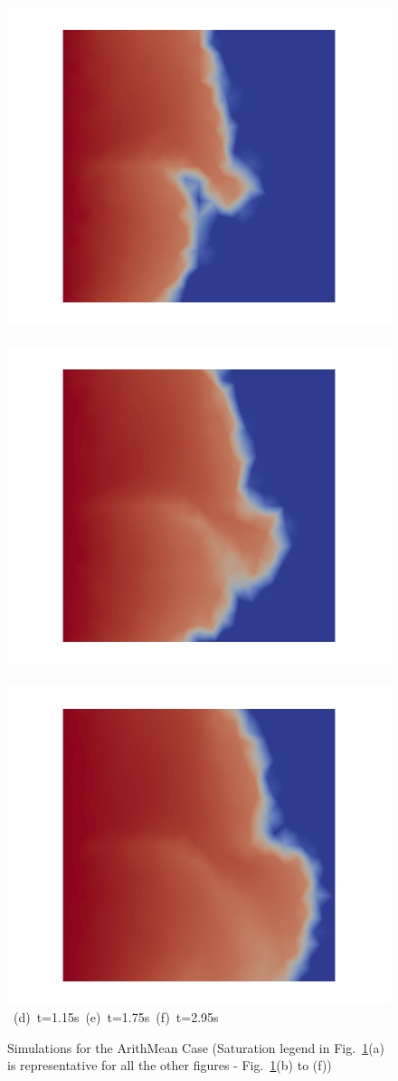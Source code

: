 \begin{landscape}
\begin{figure}[ht]
{\vspace{0.5cm}
\hbox{
      \includegraphics[width=.56\textwidth]{./Pics/ArithMeanCase/ArithMeanCase_Saturation_t_1dot15.png}
      \includegraphics[width=.56\textwidth]{./Pics/ArithMeanCase/ArithMeanCase_Saturation_t_1dot75.png} 
      \includegraphics[width=.56\textwidth]{./Pics/ArithMeanCase/ArithMeanCase_Saturation_t_2dot95.png}}
\vspace{0.cm}
\hbox{ \hspace{2.5cm} (d) t=1.15s \hspace{5.5cm} (e) t=1.75s   \hspace{5.5cm} (f) t=2.95s}
\vspace{0.cm}
}   
\caption{Simulations for the ArithMean Case (Saturation legend in Fig.~\ref{fig:ArithMeanCase_Saturation}(a) is representative for all the other figures - \ie Fig.~\ref{fig:ArithMeanCase_Saturation}(b) to (f))}
\label{fig:ArithMeanCase_Saturation}
\end{figure}
\end{landscape}
\clearpage



